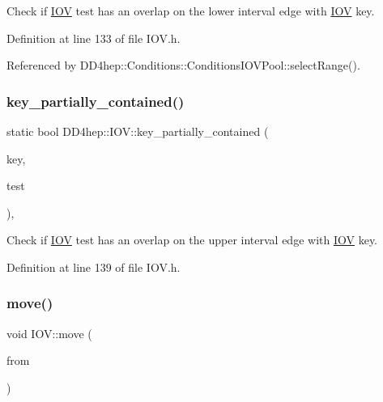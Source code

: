 Check if \hyperlink{class_d_d4hep_1_1_i_o_v}{I\+OV} \textquotesingle{}test\textquotesingle{} has an overlap on the lower interval edge with \hyperlink{class_d_d4hep_1_1_i_o_v}{I\+OV} \textquotesingle{}key\textquotesingle{}. 



Definition at line 133 of file I\+O\+V.\+h.



Referenced by D\+D4hep\+::\+Conditions\+::\+Conditions\+I\+O\+V\+Pool\+::select\+Range().

\hypertarget{class_d_d4hep_1_1_i_o_v_ae2d6950a52f1d51409a19b76385252df}{}\label{class_d_d4hep_1_1_i_o_v_ae2d6950a52f1d51409a19b76385252df} 
\subsubsection{\texorpdfstring{key\+\_\+partially\+\_\+contained()}{key\_partially\_contained()}}
{\footnotesize\ttfamily static bool D\+D4hep\+::\+I\+O\+V\+::key\+\_\+partially\+\_\+contained (\begin{DoxyParamCaption}\item[{const \hyperlink{class_d_d4hep_1_1_i_o_v_a07cb46dc875296dc9cccf4ff370104ae}{Key} \&}]{key,  }\item[{const \hyperlink{class_d_d4hep_1_1_i_o_v_a07cb46dc875296dc9cccf4ff370104ae}{Key} \&}]{test }\end{DoxyParamCaption})\hspace{0.3cm}{\ttfamily [inline]}, {\ttfamily [static]}}



Check if \hyperlink{class_d_d4hep_1_1_i_o_v}{I\+OV} \textquotesingle{}test\textquotesingle{} has an overlap on the upper interval edge with \hyperlink{class_d_d4hep_1_1_i_o_v}{I\+OV} \textquotesingle{}key\textquotesingle{}. 



Definition at line 139 of file I\+O\+V.\+h.

\hypertarget{class_d_d4hep_1_1_i_o_v_aa473ed270d7b0e3930b2654406233a3c}{}\label{class_d_d4hep_1_1_i_o_v_aa473ed270d7b0e3930b2654406233a3c} 
\subsubsection{\texorpdfstring{move()}{move()}}
{\footnotesize\ttfamily void I\+O\+V\+::move (\begin{DoxyParamCaption}\item[{\hyperlink{class_d_d4hep_1_1_i_o_v}{I\+OV} \&}]{from }\end{DoxyParamCaption})}



